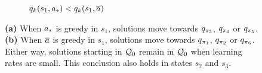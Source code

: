 \begin{figure}[H]
\begin{subfigure}[b]{0.48\textwidth}
        \caption{$q_k(s_1, {a}_*) < q_k(s_1, \overline{a})$}
        \label{fig: explain stay in box for loop action worst}
    \end{subfigure}%
    \vspace{-0.2cm}
    \caption{
    {\sffamily\textbf{(a)}} When ${a}_*$ is greedy in $s_1$, solutions move towards $q_{\pi_3}$, $q_{\pi_4}$ or $q_{\pi_5}$.
    {\sffamily\textbf{(b)}} When $\overline{a}$ is greedy in $s_1$, solutions move towards $q_{\pi_1}$, $q_{\pi_2}$ or $q_{\pi_6}$.
    Either way, 
    solutions starting in $\mathcal{Q}_0$ remain in $\mathcal{Q}_0$ when learning rates are small.
    This conclusion also holds in states $s_2$ and $s_3$.
    }
    \label{fig: explain stay in box for loop}
\end{figure}
